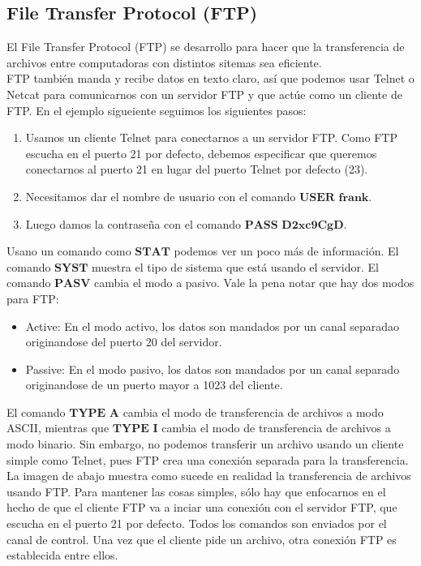 \documentclass[12pt]{report}
\begin{document}
\subsection{File Transfer Protocol (FTP)}
El File Transfer Protocol (FTP) se desarrollo para hacer que la transferencia 
de archivos entre computadoras con distintos sitemas sea eficiente.\\

FTP también manda y recibe datos en texto claro, así que podemos usar Telnet 
o Netcat para comunicarnos con un servidor FTP y que actúe como un cliente de FTP.
En el ejemplo sigueiente seguimos los siguientes pasos:
\begin{enumerate}
  \item Usamos un cliente Telnet para conectarnos a un servidor FTP. Como FTP escucha
    en el puerto 21 por defecto, debemos especificar que queremos conectarnos al puerto 21
    en lugar del puerto Telnet por defecto (23).
  \item Necesitamos dar el nombre de usuario con el comando $\textbf{USER frank}$.
  \item Luego damos la contraseña con el comando $\textbf{PASS D2xc9CgD}$.
\end{enumerate}

Usano un comando como $\textbf{STAT}$ podemos ver un poco más de información.
El comando $\textbf{SYST}$ muestra el tipo de sistema que está usando el servidor.
El comando $\textbf{PASV}$ cambia el modo a pasivo. Vale la pena notar que hay dos modos
para FTP:
\begin{itemize}
  \item Active: En el modo activo, los datos son mandados por un canal separadao originandose 
    del puerto 20 del servidor.
  \item Passive: En el modo pasivo, los datos son mandados por un canal separado originandose 
    de un puerto mayor a 1023 del cliente.
\end{itemize}

El comando $\textbf{TYPE A}$ cambia el modo de transferencia de archivos a modo ASCII, mientras que 
$\textbf{TYPE I}$ cambia el modo de transferencia de archivos a modo binario. Sin embargo, no podemos
transferir un archivo usando un cliente simple como Telnet, pues FTP crea una conexión 
separada para la transferencia.\\

La imagen de abajo muestra como sucede en realidad la transferencia de archivos usando
FTP. Para mantener las cosas simples, sólo hay que enfocarnos en el hecho de que el cliente
FTP va a inciar una conexión con el servidor FTP, que escucha en el puerto 21 por defecto.
Todos los comandos son enviados por el canal de control. Una vez que el cliente
pide un archivo, otra conexión FTP es establecida entre ellos.
\end{document}
